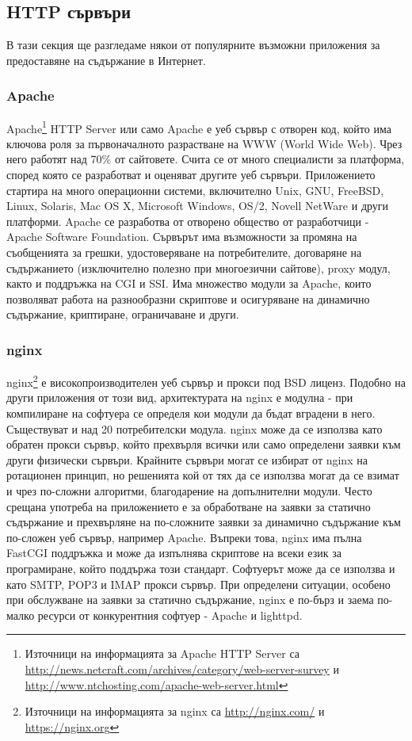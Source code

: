 \documentclass[pdftex,14pt,a4paper]{extreport}
\begin{document}
\subsection {HTTP сървъри}
В тази секция ще разгледаме някои от популярните възможни приложения за предоставяне на съдържание в Интернет.
\subsubsection {Apache}
Apache\footnote{Източници на информацията за Apache HTTP Server са \url{http://news.netcraft.com/archives/category/web-server-survey} и \url{http://www.ntchosting.com/apache-web-server.html}} HTTP Server или само Apache е уеб сървър с отворен код, който има ключова роля за първоначалното разрастване на WWW (World Wide Web). Чрез него работят над 70\% от сайтовете. Счита се от много специалисти за платформа, според която се разработват и оценяват другите уеб сървъри.
Приложението стартира на много операционни системи, включително Unix, GNU, FreeBSD, Linux, Solaris, Mac OS X, Microsoft Windows, OS/2, Novell NetWare и други платформи.
Apache се разработва от отворено общество от разработчици - Apache Software Foundation. Сървърът има възможности за промяна на съобщенията за грешки, удостоверяване на потребителите, договаряне на съдържанието (изключително полезно при многоезични сайтове), proxy модул, както и поддръжка на CGI и SSI. Има множество модули за Apache, които позволяват работа на разнообразни скриптове и осигуряване на динамично съдържание, криптиране, ограничаване и други.
\subsubsection {nginx}
nginx\footnote{Източници на информацията за nginx са \url{http://nginx.com/} и \url{https://nginx.org}} е високопроизводителен уеб сървър и прокси под BSD лиценз. Подобно на други приложения от този вид, архитектурата на nginx е модулна - при компилиране на софтуера се определя кои модули да бъдат вградени в него. Съществуват и над 20 потребителски модула.
nginx може да се използва като обратен прокси сървър, който прехвърля всички или само определени заявки към други физически сървъри. Крайните сървъри могат се избират от nginx на ротационен принцип, но решенията кой от тях да се използва могат да се взимат и чрез по-сложни алгоритми, благодарение на допълнителни модули. Често срещана употреба на приложението е за обработване на заявки за статично съдържание и прехвърляне на по-сложните заявки за динамично съдържание към по-сложен уеб сървър, например Apache. Въпреки това, nginx има пълна FastCGI поддръжка и може да изпълнява скриптове на всеки език за програмиране, който поддържа този стандарт. Софтуерът може да се използва и като SMTP, POP3 и IMAP прокси сървър.
При определени ситуации, особено при обслужване на заявки за статично съдържание, nginx е по-бърз и заема по-малко ресурси от конкурентния софтуер - Apache и lighttpd.
\end{document}
